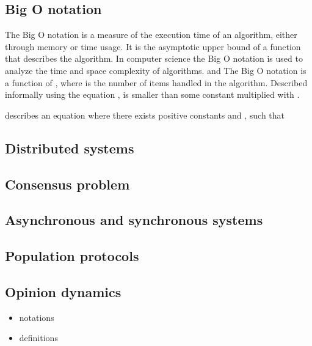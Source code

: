 

\subsection{Big O notation}
 The Big O notation is a measure of the execution time of an algorithm, either through memory or time usage. It is the asymptotic upper bound of a function that describes the algorithm. In computer science the Big O notation is used to analyze the time and space complexity of algorithms. and The Big O notation is a function of , where  is the number of items handled in the algorithm. Described informally using the equation ,  is smaller than some constant multiplied with .

 \begin{Definition}
  describes an equation where there exists positive constants  and , such that 
 \end{Definition}
 
\subsection{Distributed systems}


\subsection{Consensus problem}

\subsection{Asynchronous and synchronous systems}

\subsection{Population protocols}

\subsection{Opinion dynamics}

\begin{itemize}
    \item notations
    \item definitions
\end{itemize}


